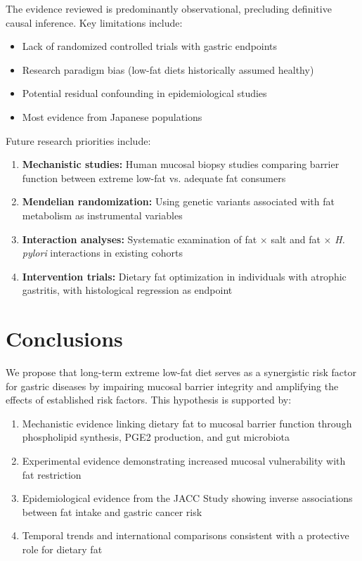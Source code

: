 \documentclass[review]{elsarticle}
\begin{document}
The evidence reviewed is predominantly observational, precluding definitive causal inference. Key limitations include:

\begin{itemize}
    \item Lack of randomized controlled trials with gastric endpoints
    \item Research paradigm bias (low-fat diets historically assumed healthy)
    \item Potential residual confounding in epidemiological studies
    \item Most evidence from Japanese populations
\end{itemize}

Future research priorities include:

\begin{enumerate}
    \item \textbf{Mechanistic studies:} Human mucosal biopsy studies comparing barrier function between extreme low-fat vs. adequate fat consumers
    \item \textbf{Mendelian randomization:} Using genetic variants associated with fat metabolism as instrumental variables
    \item \textbf{Interaction analyses:} Systematic examination of fat $\times$ salt and fat $\times$ \textit{H. pylori} interactions in existing cohorts
    \item \textbf{Intervention trials:} Dietary fat optimization in individuals with atrophic gastritis, with histological regression as endpoint
\end{enumerate}

\section{Conclusions}

We propose that long-term extreme low-fat diet serves as a synergistic risk factor for gastric diseases by impairing mucosal barrier integrity and amplifying the effects of established risk factors. This hypothesis is supported by:

\begin{enumerate}
    \item Mechanistic evidence linking dietary fat to mucosal barrier function through phospholipid synthesis, PGE2 production, and gut microbiota
    \item Experimental evidence demonstrating increased mucosal vulnerability with fat restriction
    \item Epidemiological evidence from the JACC Study showing inverse associations between fat intake and gastric cancer risk
    \item Temporal trends and international comparisons consistent with a protective role for dietary fat
\end{enumerate}
\end{document}
